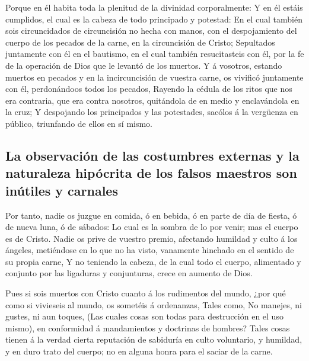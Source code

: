  Porque en él habita toda la plenitud de la divinidad
corporalmente:  Y en él estáis cumplidos, el cual es la
cabeza de todo principado y potestad:  En el cual también
sois circuncidados de circuncisión no hecha con manos, con el
despojamiento del cuerpo de los pecados de la carne, en la circuncisión
de Cristo;  Sepultados juntamente con él en el bautismo,
en el cual también resucitasteis con él, por la fe de la operación de
Dios que le levantó de los muertos.  Y á vosotros,
estando muertos en pecados y en la incircuncisión de vuestra carne, os
vivificó juntamente con él, perdonándoos todos los pecados,
 Rayendo la cédula de los ritos que nos era contraria,
que era contra nosotros, quitándola de en medio y enclavándola en la
cruz;  Y despojando los principados y las potestades,
sacólos á la vergüenza en público, triunfando de ellos en sí mismo.

\hypertarget{la-observaciuxf3n-de-las-costumbres-externas-y-la-naturaleza-hipuxf3crita-de-los-falsos-maestros-son-inuxfatiles-y-carnales}{%
\subsection{La observación de las costumbres externas y la naturaleza
hipócrita de los falsos maestros son inútiles y
carnales}\label{la-observaciuxf3n-de-las-costumbres-externas-y-la-naturaleza-hipuxf3crita-de-los-falsos-maestros-son-inuxfatiles-y-carnales}}

 Por tanto, nadie os juzgue en comida, ó en bebida, ó en
parte de día de fiesta, ó de nueva luna, ó de sábados: 
Lo cual es la sombra de lo por venir; mas el cuerpo es de Cristo.
 Nadie os prive de vuestro premio, afectando humildad y
culto á los ángeles, metiéndose en lo que no ha visto, vanamente
hinchado en el sentido de su propia carne,  Y no teniendo
la cabeza, de la cual todo el cuerpo, alimentado y conjunto por las
ligaduras y conjunturas, crece en aumento de Dios.

 Pues si sois muertos con Cristo cuanto á los rudimentos
del mundo, ¿por qué como si vivieseis al mundo, os sometéis á
ordenanzas,  Tales como, No manejes, ni gustes, ni aun
toques,  (Las cuales cosas son todas para destrucción en
el uso mismo), en conformidad á mandamientos y doctrinas de hombres?
 Tales cosas tienen á la verdad cierta reputación de
sabiduría en culto voluntario, y humildad, y en duro trato del cuerpo;
no en alguna honra para el saciar de la carne.

